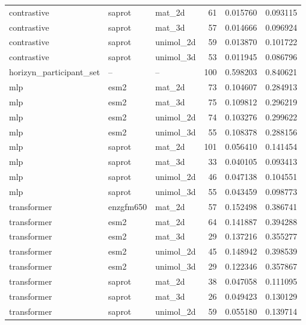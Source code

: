 \begin{longtable}{p{.32\linewidth}llrrr}
contrastive & saprot & mat\_2d & 61 & 0.015760 & 0.093115 \\
contrastive & saprot & mat\_3d & 57 & 0.014666 & 0.096924 \\
contrastive & saprot & unimol\_2d & 59 & 0.013870 & 0.101722 \\
contrastive & saprot & unimol\_3d & 53 & 0.011945 & 0.086796 \\
horizyn\_participant\_set & -- & -- & 100 & 0.598203 & 0.840621 \\
mlp & esm2 & mat\_2d & 73 & 0.104607 & 0.284913 \\
mlp & esm2 & mat\_3d & 75 & 0.109812 & 0.296219 \\
mlp & esm2 & unimol\_2d & 74 & 0.103276 & 0.299622 \\
mlp & esm2 & unimol\_3d & 55 & 0.108378 & 0.288156 \\
mlp & saprot & mat\_2d & 101 & 0.056410 & 0.141454 \\
mlp & saprot & mat\_3d & 33 & 0.040105 & 0.093413 \\
mlp & saprot & unimol\_2d & 46 & 0.047138 & 0.104551 \\
mlp & saprot & unimol\_3d & 55 & 0.043459 & 0.098773 \\
transformer & enzgfm650 & mat\_2d & 57 & 0.152498 & 0.386741 \\
transformer & esm2 & mat\_2d & 64 & 0.141887 & 0.394288 \\
transformer & esm2 & mat\_3d & 29 & 0.137216 & 0.355277 \\
transformer & esm2 & unimol\_2d & 45 & 0.148942 & 0.398539 \\
transformer & esm2 & unimol\_3d & 29 & 0.122346 & 0.357867 \\
transformer & saprot & mat\_2d & 38 & 0.047058 & 0.111095 \\
transformer & saprot & mat\_3d & 26 & 0.049423 & 0.130129 \\
transformer & saprot & unimol\_2d & 59 & 0.055180 & 0.139714 \\
\end{longtable}
